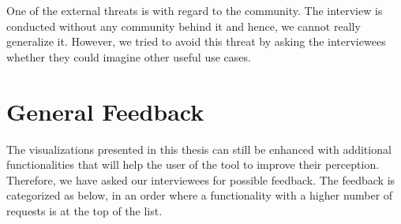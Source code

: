 One of the external threats is with regard to the community. The interview is conducted without any community behind it and hence, we cannot really generalize it. However, we tried to avoid this threat by asking the interviewees whether they could imagine other useful use cases.

\section{General Feedback}
\label{sec:4.7}

The visualizations presented in this thesis can still be enhanced with additional functionalities that will help the user of the tool to improve their perception. Therefore, we have asked our interviewees for possible feedback. The feedback is categorized as below, in an order where a functionality with a higher number of requests is at the top of the list.

